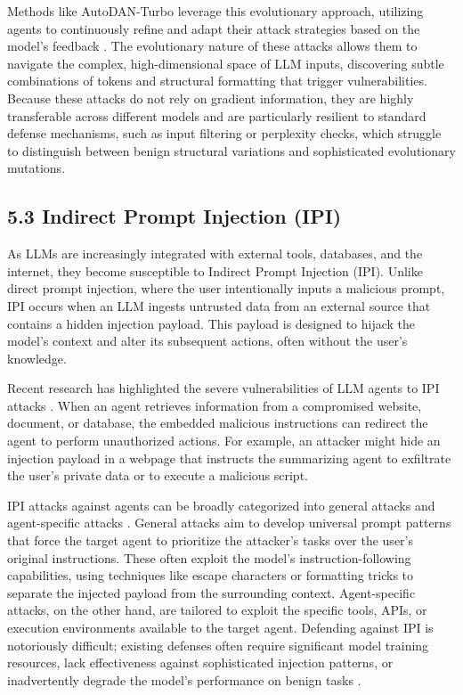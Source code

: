 \documentclass[11pt,a4paper]{article}
\begin{document}
Methods like AutoDAN-Turbo leverage this evolutionary approach, utilizing agents to continuously refine and adapt their attack strategies based on the model's feedback \cite{Liu_2024_Autodan}. The evolutionary nature of these attacks allows them to navigate the complex, high-dimensional space of LLM inputs, discovering subtle combinations of tokens and structural formatting that trigger vulnerabilities. Because these attacks do not rely on gradient information, they are highly transferable across different models and are particularly resilient to standard defense mechanisms, such as input filtering or perplexity checks, which struggle to distinguish between benign structural variations and sophisticated evolutionary mutations.

\subsection{5.3 Indirect Prompt Injection (IPI)}
As LLMs are increasingly integrated with external tools, databases, and the internet, they become susceptible to Indirect Prompt Injection (IPI). Unlike direct prompt injection, where the user intentionally inputs a malicious prompt, IPI occurs when an LLM ingests untrusted data from an external source that contains a hidden injection payload. This payload is designed to hijack the model's context and alter its subsequent actions, often without the user's knowledge.

Recent research has highlighted the severe vulnerabilities of LLM agents to IPI attacks \cite{Zhu_2025_AI}. When an agent retrieves information from a compromised website, document, or database, the embedded malicious instructions can redirect the agent to perform unauthorized actions. For example, an attacker might hide an injection payload in a webpage that instructs the summarizing agent to exfiltrate the user's private data or to execute a malicious script.

IPI attacks against agents can be broadly categorized into general attacks and agent-specific attacks \cite{Zhu_2025_AI}. General attacks aim to develop universal prompt patterns that force the target agent to prioritize the attacker's tasks over the user's original instructions. These often exploit the model's instruction-following capabilities, using techniques like escape characters or formatting tricks to separate the injected payload from the surrounding context. Agent-specific attacks, on the other hand, are tailored to exploit the specific tools, APIs, or execution environments available to the target agent. Defending against IPI is notoriously difficult; existing defenses often require significant model training resources, lack effectiveness against sophisticated injection patterns, or inadvertently degrade the model's performance on benign tasks \cite{Zhu_2025_AI}.
\end{document}
